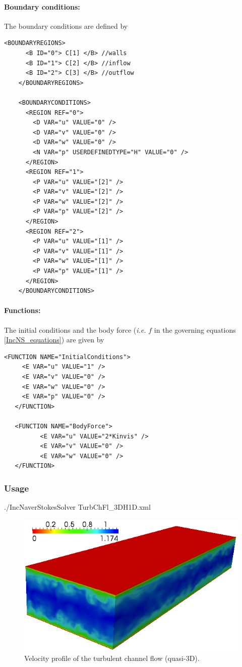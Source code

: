 \paragraph{Boundary conditions:~} The boundary conditions are defined by
\begin{lstlisting}[style=XMLStyle]
    <BOUNDARYREGIONS>
      <B ID="0"> C[1] </B> //walls
      <B ID="1"> C[2] </B> //inflow
      <B ID="2"> C[3] </B> //outflow
    </BOUNDARYREGIONS>

    <BOUNDARYCONDITIONS>
      <REGION REF="0">
        <D VAR="u" VALUE="0" />
        <D VAR="v" VALUE="0" />
        <D VAR="w" VALUE="0" />
        <N VAR="p" USERDEFINEDTYPE="H" VALUE="0" />  
      </REGION>
      <REGION REF="1">
        <P VAR="u" VALUE="[2]" />
        <P VAR="v" VALUE="[2]" />
        <P VAR="w" VALUE="[2]" />
        <P VAR="p" VALUE="[2]" />
      </REGION>
      <REGION REF="2">
        <P VAR="u" VALUE="[1]" />
        <P VAR="v" VALUE="[1]" />
        <P VAR="w" VALUE="[1]" />
        <P VAR="p" VALUE="[1]" />
      </REGION>
    </BOUNDARYCONDITIONS>
\end{lstlisting}

\paragraph{Functions:~} The initial conditions and the body force (\textit{i.e.} $f$ in the governing equations \ref{IncNS_equations}) are given by
\begin{lstlisting}[style=XMLStyle]
   <FUNCTION NAME="InitialConditions">
     <E VAR="u" VALUE="1" />
     <E VAR="v" VALUE="0" />
     <E VAR="w" VALUE="0" />
     <E VAR="p" VALUE="0" />
   </FUNCTION>
   
   <FUNCTION NAME="BodyForce">
          <E VAR="u" VALUE="2*Kinvis" />
          <E VAR="v" VALUE="0" />
          <E VAR="w" VALUE="0" />
   </FUNCTION>
\end{lstlisting}

\subsubsection{Usage} ./IncNaverStokesSolver TurbChFl\_3DH1D.xml 

\begin{figure}
\begin{center}
\includegraphics[width=12cm]{Figures/ChanCont.png}
\caption{Velocity profile of the turbulent channel flow (quasi-3D).}
\end{center}
\end{figure}

